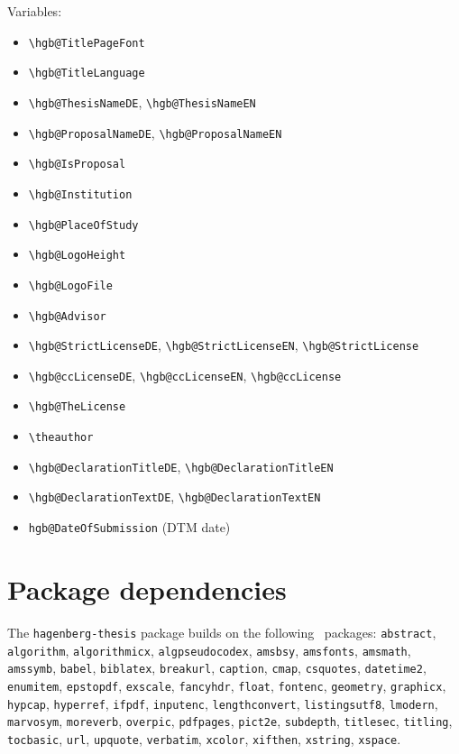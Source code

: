 \documentclass[english]{hgbarticle}
\begin{document}
Variables:
\begin{itemize}
  \item \verb!\hgb@TitlePageFont!
  \item \verb!\hgb@TitleLanguage!
  \item \verb!\hgb@ThesisNameDE!, \verb!\hgb@ThesisNameEN!
  \item \verb!\hgb@ProposalNameDE!, \verb!\hgb@ProposalNameEN!
  \item \verb!\hgb@IsProposal!
  \item \verb!\hgb@Institution!
  \item \verb!\hgb@PlaceOfStudy!
  \item \verb!\hgb@LogoHeight!
  \item \verb!\hgb@LogoFile!
  \item \verb!\hgb@Advisor!
  \item \verb!\hgb@StrictLicenseDE!, \verb!\hgb@StrictLicenseEN!, \verb!\hgb@StrictLicense!
  \item \verb!\hgb@ccLicenseDE!, \verb!\hgb@ccLicenseEN!, \verb!\hgb@ccLicense!
  \item \verb!\hgb@TheLicense!
  \item \verb!\theauthor!
  \item \verb!\hgb@DeclarationTitleDE!, \verb!\hgb@DeclarationTitleEN!
  \item \verb!\hgb@DeclarationTextDE!, \verb!\hgb@DeclarationTextEN!
  \item \verb!hgb@DateOfSubmission! (DTM date)
\end{itemize}

\section{Package dependencies}

\begin{sloppypar}
The \texttt{hagenberg-thesis} package builds on the following \latex\ packages:\newline
\texttt{abstract}, 
\texttt{algorithm}, 
\texttt{algorithmicx}, 
\texttt{algpseudocodex}, 
\texttt{amsbsy}, 
\texttt{amsfonts}, 
\texttt{amsmath}, 
\texttt{amssymb}, 
\texttt{babel}, 
\texttt{biblatex}, 
\texttt{breakurl}, 
\texttt{caption}, 
\texttt{cmap}, 
\texttt{csquotes}, 
\texttt{datetime2}, 
\texttt{enumitem}, 
\texttt{epstopdf}, 
\texttt{exscale}, 
\texttt{fancyhdr}, 
\texttt{float}, 
\texttt{fontenc}, 
\texttt{geometry}, 
\texttt{graphicx}, 
\texttt{hypcap}, 
\texttt{hyperref}, 
\texttt{ifpdf}, 
\texttt{inputenc}, 
\texttt{lengthconvert},
\texttt{listingsutf8}, 
\texttt{lmodern},
\texttt{marvosym}, 
\texttt{moreverb}, 
\texttt{overpic}, 
\texttt{pdfpages}, 
\texttt{pict2e}, 
\texttt{subdepth}, 
\texttt{titlesec}, 
\texttt{titling},
\texttt{tocbasic},
\texttt{url}, 
\texttt{upquote}, 
\texttt{verbatim}, 
\texttt{xcolor}, 
\texttt{xifthen},
\texttt{xstring},
\texttt{xspace}.
\end{sloppypar}
\end{document}
